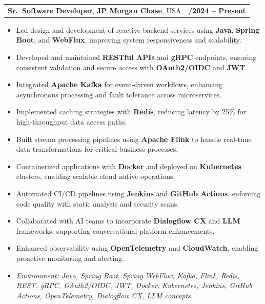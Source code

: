 \documentclass[letterpaper,11pt]{article}
\makeatletter
\newcommand{\resumeItem}[1]{
  \item\footnotesize{
    {#1 \vspace{-2pt}}
  }
}
\newcommand{\resumeSubheading}[4]{
  \vspace{-2pt}\item
    \begin{tabular*}{1.0\textwidth}[t]{l@{\extracolsep{\fill}}r}
      \textbf{\fontsize{10pt}{14pt}\selectfont #3}, \textbf{\fontsize{10pt}{14pt}\selectfont #1}, \fontsize{10pt}{14pt}\selectfont #4 & \textbf{\fontsize{10pt}{14pt}\selectfont #2} \\
    \end{tabular*}\vspace{-7pt}
}
\newcommand{\resumeItemListStart}{\begin{itemize}[leftmargin=*]}
\newcommand{\resumeItemListEnd}{\end{itemize}\vspace{-5pt}}
\makeatother
\begin{document}
\resumeSubheading
{JP Morgan Chase}{09/2024 -- Present}
{Sr.\ Software Developer}{USA}
\resumeItemListStart
  \resumeItem{Led design and development of reactive backend services using \textbf{Java}, \textbf{Spring Boot}, and \textbf{WebFlux}, improving system responsiveness and scalability.}
  \resumeItem{Developed and maintained \textbf{RESTful APIs} and \textbf{gRPC} endpoints, ensuring consistent validation and secure access with \textbf{OAuth2/OIDC} and \textbf{JWT}.}
  \resumeItem{Integrated \textbf{Apache Kafka} for event-driven workflows, enhancing asynchronous processing and fault tolerance across microservices.}
  \resumeItem{Implemented caching strategies with \textbf{Redis}, reducing latency by 25\% for high-throughput data access paths.}
  \resumeItem{Built stream processing pipelines using \textbf{Apache Flink} to handle real-time data transformations for critical business processes.}
  \resumeItem{Containerized applications with \textbf{Docker} and deployed on \textbf{Kubernetes} clusters, enabling scalable cloud-native operations.}
  \resumeItem{Automated CI/CD pipelines using \textbf{Jenkins} and \textbf{GitHub Actions}, enforcing code quality with static analysis and security scans.}
  \resumeItem{Collaborated with AI teams to incorporate \textbf{Dialogflow CX} and \textbf{LLM} frameworks, supporting conversational platform enhancements.}
  \resumeItem{Enhanced observability using \textbf{OpenTelemetry} and \textbf{CloudWatch}, enabling proactive monitoring and alerting.}
  \resumeItem{\textit{Environment: Java, Spring Boot, Spring WebFlux, Kafka, Flink, Redis, REST, gRPC, OAuth2/OIDC, JWT, Docker, Kubernetes, Jenkins, GitHub Actions, OpenTelemetry, Dialogflow CX, LLM concepts.}}
\resumeItemListEnd
\end{document}
